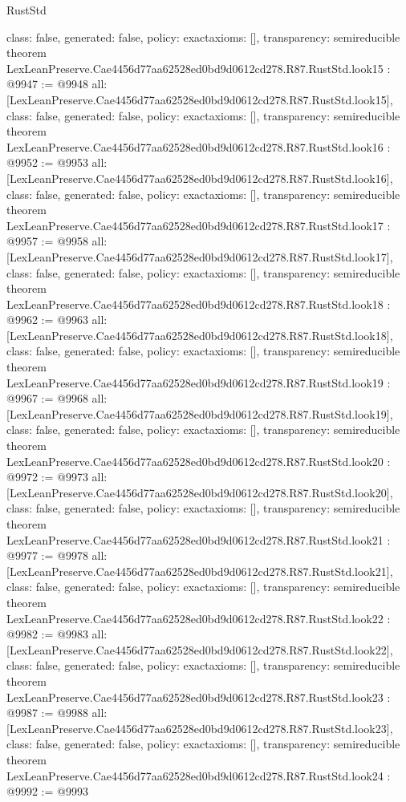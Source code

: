 \begin{lexlean}{RustStd}
\begin{coremodule}
{  class: false,
  generated: false,
  policy: exact{axioms: []},
  transparency: semireducible
}
theorem LexLeanPreserve.Cae4456d77aa62528ed0bd9d0612cd278.R87.RustStd.look15 : @9947 := @9948 {
  all: [LexLeanPreserve.Cae4456d77aa62528ed0bd9d0612cd278.R87.RustStd.look15],
  class: false,
  generated: false,
  policy: exact{axioms: []},
  transparency: semireducible
}
theorem LexLeanPreserve.Cae4456d77aa62528ed0bd9d0612cd278.R87.RustStd.look16 : @9952 := @9953 {
  all: [LexLeanPreserve.Cae4456d77aa62528ed0bd9d0612cd278.R87.RustStd.look16],
  class: false,
  generated: false,
  policy: exact{axioms: []},
  transparency: semireducible
}
theorem LexLeanPreserve.Cae4456d77aa62528ed0bd9d0612cd278.R87.RustStd.look17 : @9957 := @9958 {
  all: [LexLeanPreserve.Cae4456d77aa62528ed0bd9d0612cd278.R87.RustStd.look17],
  class: false,
  generated: false,
  policy: exact{axioms: []},
  transparency: semireducible
}
theorem LexLeanPreserve.Cae4456d77aa62528ed0bd9d0612cd278.R87.RustStd.look18 : @9962 := @9963 {
  all: [LexLeanPreserve.Cae4456d77aa62528ed0bd9d0612cd278.R87.RustStd.look18],
  class: false,
  generated: false,
  policy: exact{axioms: []},
  transparency: semireducible
}
theorem LexLeanPreserve.Cae4456d77aa62528ed0bd9d0612cd278.R87.RustStd.look19 : @9967 := @9968 {
  all: [LexLeanPreserve.Cae4456d77aa62528ed0bd9d0612cd278.R87.RustStd.look19],
  class: false,
  generated: false,
  policy: exact{axioms: []},
  transparency: semireducible
}
theorem LexLeanPreserve.Cae4456d77aa62528ed0bd9d0612cd278.R87.RustStd.look20 : @9972 := @9973 {
  all: [LexLeanPreserve.Cae4456d77aa62528ed0bd9d0612cd278.R87.RustStd.look20],
  class: false,
  generated: false,
  policy: exact{axioms: []},
  transparency: semireducible
}
theorem LexLeanPreserve.Cae4456d77aa62528ed0bd9d0612cd278.R87.RustStd.look21 : @9977 := @9978 {
  all: [LexLeanPreserve.Cae4456d77aa62528ed0bd9d0612cd278.R87.RustStd.look21],
  class: false,
  generated: false,
  policy: exact{axioms: []},
  transparency: semireducible
}
theorem LexLeanPreserve.Cae4456d77aa62528ed0bd9d0612cd278.R87.RustStd.look22 : @9982 := @9983 {
  all: [LexLeanPreserve.Cae4456d77aa62528ed0bd9d0612cd278.R87.RustStd.look22],
  class: false,
  generated: false,
  policy: exact{axioms: []},
  transparency: semireducible
}
theorem LexLeanPreserve.Cae4456d77aa62528ed0bd9d0612cd278.R87.RustStd.look23 : @9987 := @9988 {
  all: [LexLeanPreserve.Cae4456d77aa62528ed0bd9d0612cd278.R87.RustStd.look23],
  class: false,
  generated: false,
  policy: exact{axioms: []},
  transparency: semireducible
}
theorem LexLeanPreserve.Cae4456d77aa62528ed0bd9d0612cd278.R87.RustStd.look24 : @9992 := @9993 {
}
\end{coremodule}
\end{lexlean}
